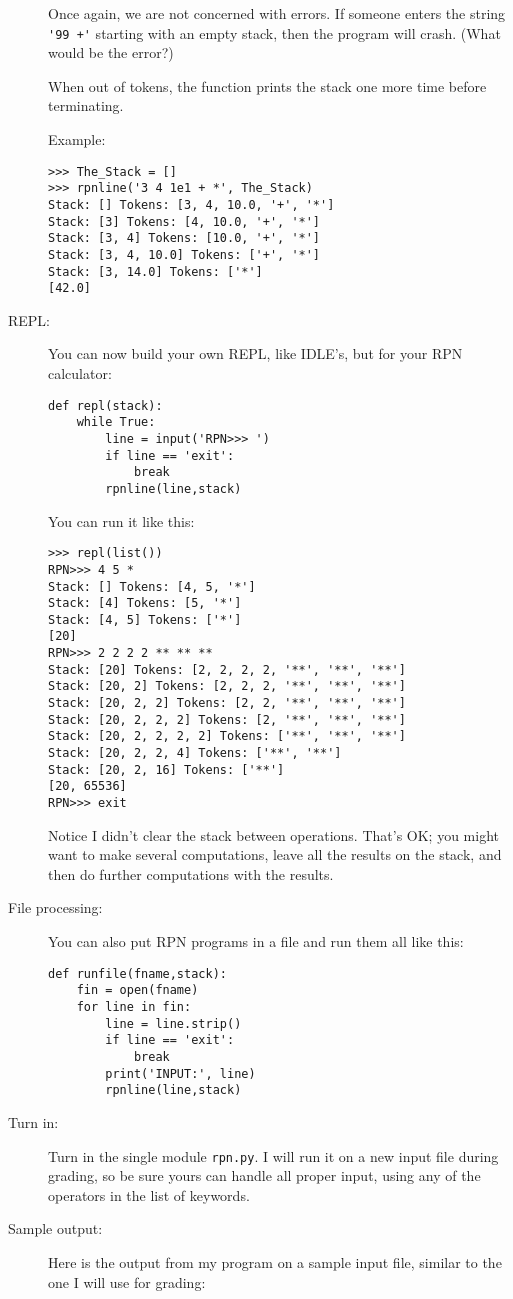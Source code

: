 \documentclass[12pt]{article}
\begin{document}
\begin{description}
Once again, we are not concerned with errors. If someone
enters the string \lstinline{'99 +'} starting with an empty stack,
then the program will crash.  (What would be the error?)

When out of tokens, the function prints the stack one more time
before terminating.

Example:
\begin{lstlisting}
>>> The_Stack = []
>>> rpnline('3 4 1e1 + *', The_Stack)
Stack: [] Tokens: [3, 4, 10.0, '+', '*']
Stack: [3] Tokens: [4, 10.0, '+', '*']
Stack: [3, 4] Tokens: [10.0, '+', '*']
Stack: [3, 4, 10.0] Tokens: ['+', '*']
Stack: [3, 14.0] Tokens: ['*']
[42.0]
\end{lstlisting}

\item[REPL:]  You can now build your
own REPL, like IDLE's, but for your RPN calculator:
\begin{lstlisting}
def repl(stack):
    while True:
        line = input('RPN>>> ')
        if line == 'exit':
            break
        rpnline(line,stack)
\end{lstlisting}
You can run it like this:
\begin{lstlisting}
>>> repl(list())
RPN>>> 4 5 *
Stack: [] Tokens: [4, 5, '*']
Stack: [4] Tokens: [5, '*']
Stack: [4, 5] Tokens: ['*']
[20]
RPN>>> 2 2 2 2 ** ** **
Stack: [20] Tokens: [2, 2, 2, 2, '**', '**', '**']
Stack: [20, 2] Tokens: [2, 2, 2, '**', '**', '**']
Stack: [20, 2, 2] Tokens: [2, 2, '**', '**', '**']
Stack: [20, 2, 2, 2] Tokens: [2, '**', '**', '**']
Stack: [20, 2, 2, 2, 2] Tokens: ['**', '**', '**']
Stack: [20, 2, 2, 4] Tokens: ['**', '**']
Stack: [20, 2, 16] Tokens: ['**']
[20, 65536]
RPN>>> exit
\end{lstlisting}
Notice I didn't  clear the stack between operations.
That's OK; you might want to make several computations,
leave all the results on the stack, and then
do further computations with the results.

\item[File processing:]  You can also put 
RPN programs in a file and run them all like
this:
\begin{lstlisting}   
def runfile(fname,stack):
    fin = open(fname)
    for line in fin:
        line = line.strip()
        if line == 'exit':
            break
        print('INPUT:', line)
        rpnline(line,stack)
\end{lstlisting}

\item[Turn in:] Turn in the single module \lstinline{rpn.py}.
I will run it on a new input file during grading,
so be sure yours can handle all proper input, 
using any of the operators in the list of keywords.

\item[Sample output:] Here is the output from my program
on a sample input file, similar to the one I will use for
grading:
\end{description}
\end{document}
